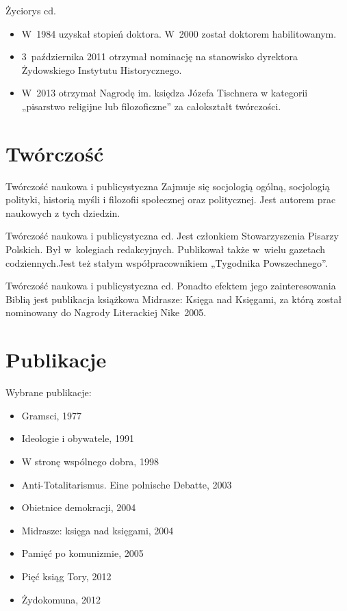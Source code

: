 \documentclass{beamer}
\begin{document}
\begin{frame}{Życiorys cd.}
\begin {itemize}
\item<1> W~1984 uzyskał stopień doktora. W~2000 został doktorem habilitowanym.
\pause
\item<2>3~października 2011 otrzymał nominację na stanowisko dyrektora Żydowskiego Instytutu Historycznego.
\item<3> W~2013 otrzymał Nagrodę im. księdza Józefa Tischnera w kategorii „pisarstwo religijne lub filozoficzne” za całokształt twórczości.
\end {itemize}
\end {frame}

\section{Twórczość}
\begin{frame}{Twórczość naukowa i publicystyczna}
Zajmuje się socjologią ogólną, socjologią polityki, historią myśli i filozofii społecznej oraz politycznej. Jest autorem prac naukowych z tych dziedzin.
\end {frame}

\begin{frame}{Twórczość naukowa i publicystyczna cd.}
Jest członkiem Stowarzyszenia Pisarzy Polskich. Był w~kolegiach redakcyjnych. Publikował także w~wielu gazetach codziennych.Jest też stałym współpracownikiem „Tygodnika Powszechnego”.
\end {frame}

\begin{frame}{Twórczość naukowa i publicystyczna cd.}
Ponadto efektem jego zainteresowania Biblią jest publikacja książkowa Midrasze: Księga nad Księgami, za którą został nominowany do Nagrody Literackiej Nike~2005.
\end {frame}

\section{Publikacje}
\begin{frame}{Wybrane publikacje:}
\begin {itemize}
\pause
\item Gramsci, 1977 \pause
\item Ideologie i obywatele, 1991 \pause
\item W stronę wspólnego dobra, 1998 \pause
\item Anti-Totalitarismus. Eine polnische Debatte, 2003 \pause
\item Obietnice demokracji, 2004 \pause
\item Midrasze: księga nad księgami, 2004 \pause
\item Pamięć po komunizmie, 2005 \pause
\item Pięć ksiąg Tory, 2012 \pause
\item Żydokomuna, 2012 
\end {itemize} 
\end {frame}
\end{document}
